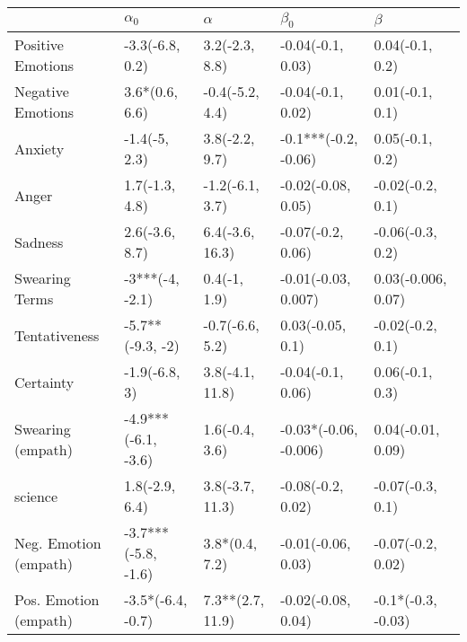 \begin{tabular}{lllll}
\toprule
{} &           $\alpha_0$ &          $\alpha$ &              $\beta_0$ &             $\beta$ \\
\midrule
Positive Emotions     &      -3.3(-6.8, 0.2) &    3.2(-2.3, 8.8) &      -0.04(-0.1, 0.03) &     0.04(-0.1, 0.2) \\
Negative Emotions     &       3.6*(0.6, 6.6) &   -0.4(-5.2, 4.4) &      -0.04(-0.1, 0.02) &     0.01(-0.1, 0.1) \\
Anxiety               &        -1.4(-5, 2.3) &    3.8(-2.2, 9.7) &   -0.1***(-0.2, -0.06) &     0.05(-0.1, 0.2) \\
Anger                 &       1.7(-1.3, 4.8) &   -1.2(-6.1, 3.7) &     -0.02(-0.08, 0.05) &    -0.02(-0.2, 0.1) \\
Sadness               &       2.6(-3.6, 8.7) &   6.4(-3.6, 16.3) &      -0.07(-0.2, 0.06) &    -0.06(-0.3, 0.2) \\
Swearing Terms        &      -3***(-4, -2.1) &      0.4(-1, 1.9) &    -0.01(-0.03, 0.007) &  0.03(-0.006, 0.07) \\
Tentativeness         &     -5.7**(-9.3, -2) &   -0.7(-6.6, 5.2) &       0.03(-0.05, 0.1) &    -0.02(-0.2, 0.1) \\
Certainty             &        -1.9(-6.8, 3) &   3.8(-4.1, 11.8) &      -0.04(-0.1, 0.06) &     0.06(-0.1, 0.3) \\
Swearing (empath)     &  -4.9***(-6.1, -3.6) &    1.6(-0.4, 3.6) &  -0.03*(-0.06, -0.006) &   0.04(-0.01, 0.09) \\
science               &       1.8(-2.9, 6.4) &   3.8(-3.7, 11.3) &      -0.08(-0.2, 0.02) &    -0.07(-0.3, 0.1) \\
Neg. Emotion (empath) &  -3.7***(-5.8, -1.6) &    3.8*(0.4, 7.2) &     -0.01(-0.06, 0.03) &   -0.07(-0.2, 0.02) \\
Pos. Emotion (empath) &    -3.5*(-6.4, -0.7) &  7.3**(2.7, 11.9) &     -0.02(-0.08, 0.04) &  -0.1*(-0.3, -0.03) \\
\bottomrule
\end{tabular}
